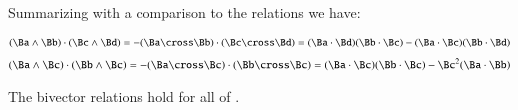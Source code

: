 Summarizing with a comparison to the  relations we have:

\begin{align}
\label{eqn:bivector:boo2}
(\Ba \wedge \Bb) \cdot (\Bc \wedge \Bd) = -(\Ba \cross \Bb) \cdot (\Bc \cross \Bd) = ( \Ba \cdot \Bd ) ( \Bb \cdot \Bc ) - ( \Ba \cdot \Bc ) ( \Bb \cdot \Bd )
\end{align}
\begin{align}
\label{eqn:bivector:boo3}
(\Ba \wedge \Bc) \cdot (\Bb \wedge \Bc) = -(\Ba \cross \Bc) \cdot (\Bb \cross \Bc) = ( \Ba \cdot \Bc ) ( \Bb \cdot \Bc ) - \Bc^2 ( \Ba \cdot \Bb )
\end{align}

The bivector relations hold for all of .

\EndNoBibArticle
